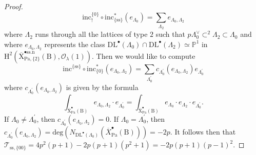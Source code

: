 \documentclass[10pt]{amsart}
\numberwithin{equation}{section}
\theoremstyle{definition}
\def\Pa{\mathrm{Pa}}
\def\calO{\mathcal{O}}
\def\calT{\mathcal{T}}
\def\PP{\mathbb{P}}
\def\rmB{\mathrm{B}}
\def\rmH{\mathrm{H}}
\def\rmX{\mathrm{X}}
\begin{document}
\begin{proof}
\begin{equation*}
\mathrm{inc}^{\{0\}}_{!}\circ \mathrm{inc}^{\ast}_{\{\mathrm{ss}\}}(e_{\Lambda_{0}})=\sum_{\Lambda_{2}}e_{\Lambda_{0}, \Lambda_{2}}
\end{equation*}
where $\Lambda_{2}$ runs through all the lattices of type $2$ such that $p\Lambda^{\vee}_{0}\subset^{2}\Lambda_{2}\subset \Lambda_{0}$ and where $e_{\Lambda_{0},\Lambda_{2}}$ represents the class $\mathrm{DL}^{\bullet}(\Lambda_{0})\cap \mathrm{DL}^{\bullet}(\Lambda_{2})\simeq\PP^{1}$ in $\rmH^{2}(\overline{\rmX}^{\bullet\mathrm{ss.n}}_{\Pa, \{2\}}(\rmB), \calO_{\lambda}(1))$. Then we would like to compute
\begin{equation*}
\mathrm{inc}^{\{\mathrm{ss}\}}\circ\mathrm{inc}^{\ast}_{\{0\}}(e_{\Lambda_{0}, \Lambda_{2}})=\sum_{\Lambda^{\prime}_{0}} c_{\Lambda^{\prime}_{0}}(e_{\Lambda_{0},\Lambda_{2}})e_{\Lambda^{\prime}_{0}}
\end{equation*}
where $c_{\Lambda^{\prime}_{0}}(e_{\Lambda_{0},\Lambda_{2}})$ is given by the formula
\begin{equation*}
\int_{\overline{\rmX}^{\bullet}_{\Pa}(\rmB)}e_{\Lambda_{0},\Lambda_{2}}\cdot e_{\Lambda^{\prime}_{0}}=\int_{\overline{\rmX}^{\bullet}_{\Pa}(\rmB)}e_{\Lambda_{0}}\cdot e_{\Lambda_{2}}\cdot e_{\Lambda^{\prime}_{0}}.
\end{equation*}
If $\Lambda_{0}\neq \Lambda^{\prime}_{0}$, then $c_{\Lambda^{\prime}_{0}}(e_{\Lambda_{0},\Lambda_{2}})=0$. If $\Lambda_{0}=\Lambda^{\prime}_{0}$, then $c_{\Lambda^{\prime}_{0}}(e_{\Lambda_{0},\Lambda_{2}})=\mathrm{deg}(N_{\mathrm{DL}^{\bullet}(\Lambda_{0})}(\overline{X}^{\bullet}_{\Pa}(\rmB)))=-2p$. It follows then that $\calT_{\mathrm{ss},\{00\}}=4p^{2}(p+1)-2p(p+1)(p^{2}+1)=-2p(p+1)(p-1)^{2}$.


\end{proof}
\end{document}
